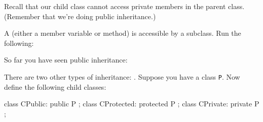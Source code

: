 \newpage{}

Recall that our child class cannot access private members in the parent
class. (Remember that we're doing public inheritance.)

A  (either a member variable or method) is
accessible by a subclass. Run the following:

\newpage{}

So far you have seen public inheritance:

There are two other types of inheritance: . Suppose you have a class \verb!P!. Now define the following child classes:
\begin{console}
class CPublic: public P {};
class CProtected: protected P {};
class CPrivate: private P {}; 
\end{console}

